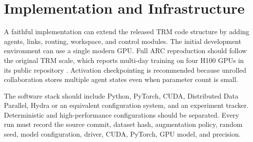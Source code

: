 \documentclass[10pt,a4paper,twocolumn]{article}
\begin{document}
\begin{table}[t]
\caption{Minimum ablation matrix for a publication-quality evaluation. Every row should report exact accuracy, cell accuracy, calibration, parameters, FLOPs, mean rounds, active agents, memory, and GPU-hours.}
\label{tab:ablations}
\centering
\small
{}
\end{table}

\section{Implementation and Infrastructure}
A faithful implementation can extend the released TRM code structure by adding agents, links, routing, workspace, and control modules. The initial development environment can use a single modern GPU. Full ARC reproduction should follow the original TRM scale, which reports multi-day training on four H100 GPUs in its public repository \cite{trmgithub2026}. Activation checkpointing is recommended because unrolled collaboration stores multiple agent states even when parameter count is small.

The software stack should include Python, PyTorch, CUDA, Distributed Data Parallel, Hydra or an equivalent configuration system, and an experiment tracker. Deterministic and high-performance configurations should be separated. Every run must record the source commit, dataset hash, augmentation policy, random seed, model configuration, driver, CUDA, PyTorch, GPU model, and precision.
\end{document}
